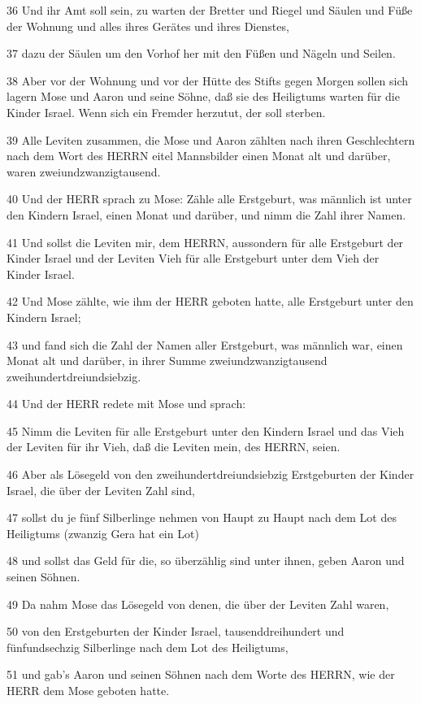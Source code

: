 \par 36 Und ihr Amt soll sein, zu warten der Bretter und Riegel und Säulen und Füße der Wohnung und alles ihres Gerätes und ihres Dienstes,
\par 37 dazu der Säulen um den Vorhof her mit den Füßen und Nägeln und Seilen.
\par 38 Aber vor der Wohnung und vor der Hütte des Stifts gegen Morgen sollen sich lagern Mose und Aaron und seine Söhne, daß sie des Heiligtums warten für die Kinder Israel. Wenn sich ein Fremder herzutut, der soll sterben.
\par 39 Alle Leviten zusammen, die Mose und Aaron zählten nach ihren Geschlechtern nach dem Wort des HERRN eitel Mannsbilder einen Monat alt und darüber, waren zweiundzwanzigtausend.
\par 40 Und der HERR sprach zu Mose: Zähle alle Erstgeburt, was männlich ist unter den Kindern Israel, einen Monat und darüber, und nimm die Zahl ihrer Namen.
\par 41 Und sollst die Leviten mir, dem HERRN, aussondern für alle Erstgeburt der Kinder Israel und der Leviten Vieh für alle Erstgeburt unter dem Vieh der Kinder Israel.
\par 42 Und Mose zählte, wie ihm der HERR geboten hatte, alle Erstgeburt unter den Kindern Israel;
\par 43 und fand sich die Zahl der Namen aller Erstgeburt, was männlich war, einen Monat alt und darüber, in ihrer Summe zweiundzwanzigtausend zweihundertdreiundsiebzig.
\par 44 Und der HERR redete mit Mose und sprach:
\par 45 Nimm die Leviten für alle Erstgeburt unter den Kindern Israel und das Vieh der Leviten für ihr Vieh, daß die Leviten mein, des HERRN, seien.
\par 46 Aber als Lösegeld von den zweihundertdreiundsiebzig Erstgeburten der Kinder Israel, die über der Leviten Zahl sind,
\par 47 sollst du je fünf Silberlinge nehmen von Haupt zu Haupt nach dem Lot des Heiligtums (zwanzig Gera hat ein Lot)
\par 48 und sollst das Geld für die, so überzählig sind unter ihnen, geben Aaron und seinen Söhnen.
\par 49 Da nahm Mose das Lösegeld von denen, die über der Leviten Zahl waren,
\par 50 von den Erstgeburten der Kinder Israel, tausenddreihundert und fünfundsechzig Silberlinge nach dem Lot des Heiligtums,
\par 51 und gab's Aaron und seinen Söhnen nach dem Worte des HERRN, wie der HERR dem Mose geboten hatte.


